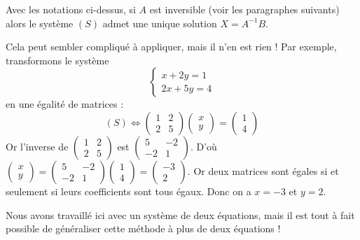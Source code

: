 	\begin{formula}
		Avec les notations ci-dessus, si $A$ est inversible (voir les paragraphes suivants) alors le système $(S)$ admet une unique solution $X = A^{-1}B$.
	\end{formula}

	\begin{tip}[Exemple]
		Cela peut sembler compliqué à appliquer, mais il n'en est rien !
		\newpar
		Par exemple, transformons le système
		\[ \begin{cases}x + 2y = 1 \\ 2x + 5y = 4 \end{cases} \tag{S} \]
		en une égalité de matrices :
		\newpar
		\[ (S) \iff \begin{pmatrix}1 & 2 \\ 2 & 5\end{pmatrix} \begin{pmatrix}x \\ y\end{pmatrix} = \begin{pmatrix}1 \\ 4 \end{pmatrix} \]
		\newpar
		Or l'inverse de $\begin{pmatrix}1 & 2 \\ 2 & 5\end{pmatrix}$ est $\begin{pmatrix}5 & -2 \\ -2 & 1\end{pmatrix}$. D'où $\begin{pmatrix}x \\ y\end{pmatrix} = \begin{pmatrix}5 & -2 \\ -2 & 1\end{pmatrix} \begin{pmatrix}1 \\ 4\end{pmatrix} = \begin{pmatrix}-3 \\ 2\end{pmatrix}$.
		\newpar
		Or deux matrices sont égales si et seulement si leurs coefficients sont tous égaux. Donc on a $x = -3$ et $y = 2$.
	\end{tip}

	Nous avons travaillé ici avec un système de deux équations, mais il est tout à fait possible de généraliser cette méthode à plus de deux équations !

